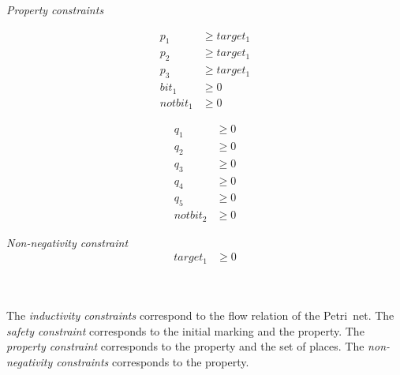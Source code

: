 \begin{minipage}{\columnwidth}
  \emph{Property constraints} \\[-2em]
  \begin{minipage}[t]{.49\columnwidth}
    \centering
    \begin{align*}
      p_1   & \ge target_1 \\[-0.4em]
      p_2   & \ge target_1 \\[-0.4em]
      p_3   & \ge target_1 \\[-0.4em]
      bit_1 & \ge 0        \\[-0.4em]
      notbit_1 & \ge 0
    \end{align*}
  \end{minipage}
  \begin{minipage}[t]{.49\columnwidth}
    \centering
    \begin{align*}
      q_1   & \ge 0 \\[-0.4em]
      q_2   & \ge 0 \\[-0.4em]
      q_3   & \ge 0 \\[-0.4em]
      q_4   & \ge 0 \\[-0.4em]
      q_5   & \ge 0 \\[-0.4em]
      notbit_2 & \ge 0
    \end{align*}
  \end{minipage}
\end{minipage}
\begin{minipage}{\columnwidth}
  \emph{Non-negativity constraint}\\[-2em]
  \begin{align*}
    target_1 & \ge 0
  \end{align*}
\end{minipage}
\\ \mbox{ } \\
The \emph{inductivity constraints} correspond to the flow relation of the
Petri~net.
The \emph{safety constraint} corresponds to the initial marking and
the property.
The \emph{property constraint} corresponds to the property and the set
of places.
The \emph{non-negativity constraints} corresponds to the property.

